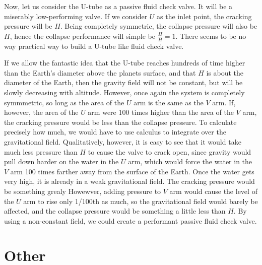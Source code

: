\documentclass{asme2ej}
\begin{document}
Now, let us consider the U-tube as a passive fluid check valve.
It will be a miserably low-performing valve. If we consider $U$ as
the inlet point, the cracking pressure will be $H$. Being completely
symmetric, the collapse pressure will also be $H$, hence the collapse
performance will simple be $\frac{H}{H} = 1$. There seems to
be no way practical way to build a U-tube like fluid check valve.

If we allow the fantastic idea that the U-tube reaches hundreds of time
higher than the Earth's diameter above the
planets surface, and that $H$ is about the diameter of the Earth,
then the gravity field will not be constant, but will
be slowly decreasing with altitude. However, once again the system
is completely symmmetric, so long as the area of the $U$ arm is the same
as the $V$ arm. If, however, the area of the $U$ arm were 100 times higher
than the area of the $V$ arm, the cracking pressure would be less than
the collapse pressure. To calculate precisely how much, we would have to
use calculus to integrate over the gravitational field.
Qualitatively, however, it is easy to see that it would take much less pressure
than $H$ to cause the valve to crack open, since gravity would pull down harder
on the water in the $U$ arm, which would force the water in the $V$ arm
100 times farther away from the surface of the Earth.
Once the water gets very high, it is already in a weak gravitational field.
The cracking pressure would be something grealy
Howewver, adding pressure to $V$ arm would cause the level of the $U$ arm
to rise only 1/100th as much, so the gravitational field would barely
be affected, and the collapse pressure would be something a little less than $H$.
By using a non-constant field, we could create a performant passive fluid check valve.


\section{Other}
\end{document}
